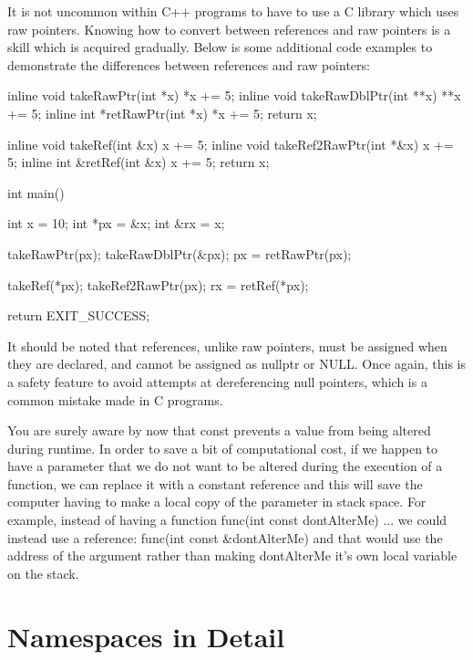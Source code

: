 \documentclass{article}
\begin{document}
It is not uncommon within C++ programs to have to use a C library which uses raw pointers. Knowing how to
convert between references and raw pointers is a skill which is acquired gradually. Below is some additional
code examples to demonstrate the differences between references and raw pointers:

\begin{cpplst}
inline void takeRawPtr(int *x) { *x += 5; }
inline void takeRawDblPtr(int **x) { **x += 5; }
inline int *retRawPtr(int *x) { *x += 5; return x; }

inline void takeRef(int &x) { x += 5; }
inline void takeRef2RawPtr(int *&x) { x += 5; }
inline int &retRef(int &x) { x += 5; return x; }

int main()
{
    int x = 10;
    int *px = &x;
    int &rx = x;

    takeRawPtr(px);
    takeRawDblPtr(&px);
    px = retRawPtr(px);

    takeRef(*px);
    takeRef2RawPtr(px);
    rx = retRef(*px);

    return EXIT_SUCCESS;
}
\end{cpplst}

It should be noted that references, unlike raw pointers, must be assigned when they are declared, and cannot
be assigned as nullptr or NULL. Once again, this is a safety feature to avoid attempts at dereferencing null
pointers, which is a common mistake made in C programs.

You are surely aware by now that const prevents a value from being altered during runtime. In order to save a
bit of computational cost, if we happen to have a parameter that we do not want to be altered during the
execution of a function, we can replace it with a constant reference and this will save the computer having to
make a local copy of the parameter in stack space. For example, instead of having a function
func(int const dontAlterMe) {...} we could instead use a reference: func(int const \&dontAlterMe)
and that would use the address of the argument rather than making dontAlterMe it's own local variable on the
stack.

\section{Namespaces in Detail}
\end{document}
